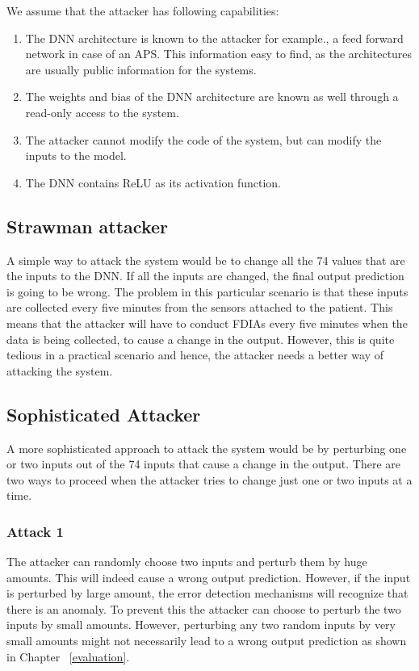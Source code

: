 We assume that the attacker has following capabilities:
\begin{enumerate}
	\item The \ac{DNN}  architecture  is known to the attacker for example., a feed forward  network in case of an \ac{APS}. This information easy to find, as the architectures are  usually public information for the systems. 
	\item  The weights and bias of the \ac{DNN}  architecture are known as well through a read-only access to the system.  
	\item The attacker cannot modify the code of the system, but can modify the inputs to the model.
	\item The \ac{DNN} contains ReLU as its activation function. %
\end{enumerate}

\subsection{Strawman attacker}
A simple way to attack the system would be to change all the 74 values that are the inputs to the DNN.
 If all the inputs are changed, the final output prediction is going to be wrong. The problem in this particular scenario is that 
 these inputs are collected every five minutes from the sensors attached to the patient. 
 This means that the attacker will have to conduct FDIAs every five minutes when the data is being collected, to cause a change in the output. 
 However, this is quite tedious in a practical scenario and hence, the attacker needs a better way of attacking the system. 

\subsection{Sophisticated Attacker}
A more sophisticated approach to attack the system would be by perturbing one or two inputs out of the 74 inputs that cause a change in the output. There are two ways to proceed when the attacker tries to change just one or two inputs at a time. 

\subsubsection{Attack 1}
The attacker can randomly choose two inputs and perturb them by huge amounts. 
This will indeed cause a wrong output prediction. 
However, if the input is perturbed by large amount, the error detection mechanisms will recognize that there is an anomaly. 
To prevent this the attacker can choose to perturb the two inputs by small amounts. 
However, perturbing any two random inputs by very small amounts might not necessarily lead to a wrong output prediction as shown in Chapter ~\ref{evaluation}. 

